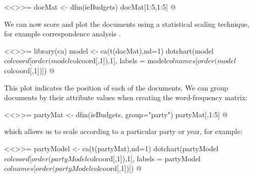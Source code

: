 <<>>=
docMat <- dfm(ieBudgets)
docMat[1:5,1:5]
@

We can now score and plot the documents using a statistical scaling technique, for example correspondence analysis \citep{nenadic2007}.

<<>>=
library(ca)
model <- ca(t(docMat),nd=1)
dotchart(model$colcoord[order(model$colcoord[,1]),1], labels = model$colnames[order(model$colcoord[,1])])
@

This plot indicates the position of each of the documents. We can group documents by their attribute values when creating the word-frequency matrix: 

<<>>=
partyMat <- dfm(ieBudgets, group="party")
partyMat[,1:5]
@

which allows us to scale according to a particular party or year, for example:

<<>>=
partyModel <- ca(t(partyMat),nd=1)
dotchart(partyModel$colcoord[order(partyModel$colcoord[,1]),1], labels = partyModel$colnames[order(partyModel$colcoord[,1])])
@
%
%




